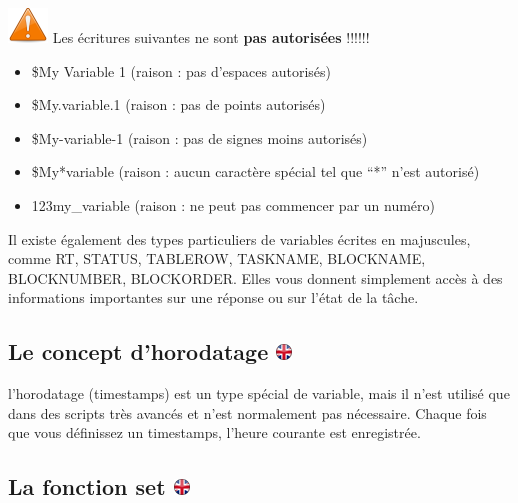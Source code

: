\documentclass[
]{book}
\providecommand{\tightlist}{%
  \setlength{\itemsep}{0pt}\setlength{\parskip}{0pt}}
\begin{document}
\includegraphics{img/attention.png} Les écritures suivantes ne sont
\textbf{pas autorisées} !!!!!!

\begin{itemize}
\tightlist
\item
  \$My Variable 1 (raison : pas d'espaces autorisés)
\item
  \$My.variable.1 (raison : pas de points autorisés)
\item
  \$My-variable-1 (raison : pas de signes moins autorisés)
\item
  \$My*variable (raison : aucun caractère spécial tel que ``*'' n'est
  autorisé)
\item
  123my\_variable (raison : ne peut pas commencer par un numéro)
\end{itemize}

Il existe également des types particuliers de variables écrites en
majuscules, comme RT, STATUS, TABLEROW, TASKNAME, BLOCKNAME,
BLOCKNUMBER, BLOCKORDER. Elles vous donnent simplement accès à des
informations importantes sur une réponse ou sur l'état de la tâche.

\hypertarget{le-concept-dhorodatage}{%
\subsection[Le concept d'horodatage ]{\texorpdfstring{Le concept
d'horodatage
\href{https://www.psytoolkit.org/doc3.2.0/syntax.html\#timestamp}{\protect\includegraphics{img/ukflag.png}}}{Le concept d'horodatage }}\label{le-concept-dhorodatage}}

l'horodatage (timestamps) est un type spécial de variable, mais il n'est
utilisé que dans des scripts très avancés et n'est normalement pas
nécessaire. Chaque fois que vous définissez un timestamps, l'heure
courante est enregistrée.

\hypertarget{la-fonction-set}{%
\subsection[La fonction set ]{\texorpdfstring{La fonction set
\href{https://www.psytoolkit.org/doc3.2.0/syntax.html\#task-set}{\protect\includegraphics{img/ukflag.png}}}{La fonction set }}\label{la-fonction-set}}
\end{document}
